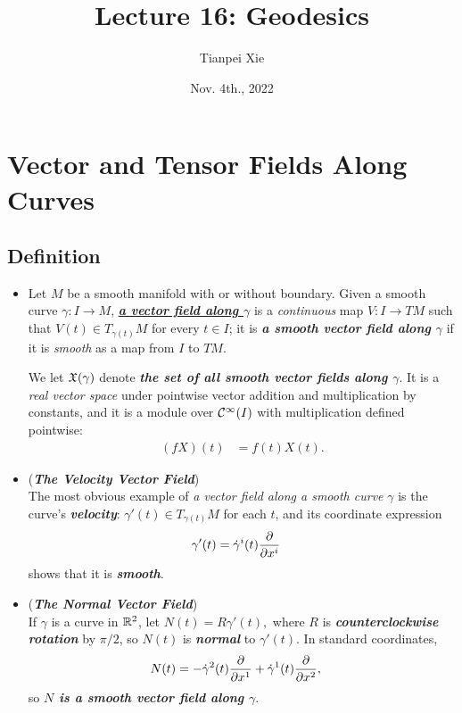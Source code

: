 \documentclass[11pt]{article}
\begin{document}
\title{Lecture 16: Geodesics}
\author{ Tianpei Xie}
\date{Nov. 4th., 2022}
\maketitle
\tableofcontents
\newpage
\section{Vector and Tensor Fields Along Curves}
\subsection{Definition}
\begin{itemize}
\item \begin{definition}
Let $M$ be a smooth manifold with or without boundary. Given a smooth curve $\gamma: I \rightarrow M$, \underline{\emph{\textbf{a vector field along $\gamma$}}} is a \emph{continuous} map $V: I \rightarrow TM$ such that $V(t) \in T_{\gamma(t)}M$ for every $t \in I$; it is \emph{\textbf{a smooth vector field along $\gamma$}} if it is \emph{smooth} as a map from $I$ to $TM$. 

We let ${\mathfrak X}(\gamma)$ denote \emph{\textbf{the set of all smooth vector fields along $\gamma$}}. It is a \emph{real vector space} under pointwise vector addition and multiplication by constants, and it is a module over ${\mathcal C}^{\infty}(I)$ with multiplication defined pointwise:
\begin{align*}
(fX)(t) &= f(t)X(t).
\end{align*}
\end{definition}

\item \begin{example} (\emph{\textbf{The Velocity Vector Field}})\\
The most obvious example of \emph{a vector field along a smooth curve} $\gamma$ is the curve's \emph{\textbf{velocity}}: $\gamma'(t) \in T_{\gamma(t)}M$ for each $t$, and its coordinate expression 
\begin{align*}
\gamma'(t) &= \dot{\gamma}^i(t)\frac{\partial }{ \partial x^i}
\end{align*} shows that it is \emph{\textbf{smooth}}. 
\end{example}

\item \begin{example} (\emph{\textbf{The Normal Vector Field}})\\
If $\gamma$ is a curve in ${\mathbb R}^2$, let $N(t) = R\gamma'(t),$ where $R$ is \emph{\textbf{counterclockwise rotation}} by $\pi/2$, so $N(t)$ is \emph{\textbf{normal}} to $\gamma'(t)$. In standard coordinates, 
\begin{align*}
N(t) &= -\dot{\gamma}^2(t)\frac{\partial }{ \partial x^1} + \dot{\gamma}^1(t)\frac{\partial }{ \partial x^2},
\end{align*}
so \emph{\textbf{$N$ is a smooth vector field along $\gamma$}}.
\end{example}


\end{itemize}
\end{document}
